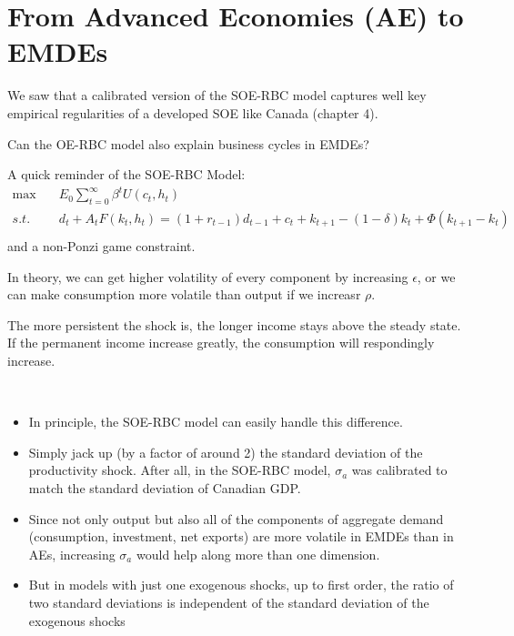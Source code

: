 \section{From Advanced Economies (AE) to EMDEs}

We saw that a calibrated version of the SOE-RBC model captures well
key empirical regularities of a developed SOE like Canada (chapter 4).
\begin{question}
    Can the OE-RBC model also explain business cycles in EMDEs?
\end{question}

\begin{note}
    A quick reminder of the SOE-RBC Model:
    \begin{align*}
        \max \quad & E_0 \sum_{t=0}^{\infty}\beta ^t U(c_t, h_t) \\
        s.t. \quad & d_t + A_t F(k_t, h_t) = (1+r_{t-1} )d_{t-1} +c_t + k_{t+1} - (1-\delta)k_t + \Phi(k_{t+1} - k_t) \\
    \end{align*}
    and a non-Ponzi game constraint.
\end{note}

In theory, we can get higher volatility of every component by increasing $\epsilon$, or we can make consumption more volatile than output if we increasr
$\rho $.

The more persistent the shock is, the longer income stays above the steady state.
If the permanent income increase greatly, the consumption will respondingly increase.

\begin{intuition}
    \ 

    \begin{itemize}
        \item In principle, the SOE-RBC model can easily handle this difference.
        \item Simply jack up (by a factor of around 2) the standard deviation of the productivity shock. After all, in the SOE-RBC model, $\sigma _a$ was calibrated to match the standard deviation of Canadian GDP.
        \item Since not only output but also all of the components of aggregate demand (consumption, investment, net exports) are more volatile in
        EMDEs than in AEs, increasing $\sigma _a$ would help along more than one dimension.
        \item But in models with just one exogenous shocks, up to first order, the
        ratio of two standard deviations is independent of the standard
        deviation of the exogenous shocks
    \end{itemize}
\end{intuition}

